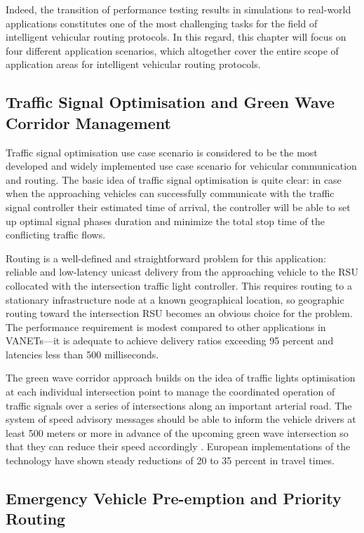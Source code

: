 \documentclass[12pt]{article}
\begin{document}
Indeed, the transition of performance testing results in simulations to real-world applications constitutes one of the most challenging tasks for the field of intelligent vehicular routing protocols. In this regard, this chapter will focus on four different application scenarios, which altogether cover the entire scope of application areas for intelligent vehicular routing protocols.

\subsection{Traffic Signal Optimisation and Green Wave Corridor Management}

Traffic signal optimisation use case scenario is considered to be the most developed and widely implemented use case scenario for vehicular communication and routing. The basic idea of traffic signal optimisation is quite clear: in case when the approaching vehicles can successfully communicate with the traffic signal controller their estimated time of arrival, the controller will be able to set up optimal signal phases duration and minimize the total stop time of the conflicting traffic flows.

Routing is a well-defined and straightforward problem for this application: reliable and low-latency unicast delivery from the approaching vehicle to the RSU collocated with the intersection traffic light controller. This requires routing to a stationary infrastructure node at a known geographical location, so geographic routing toward the intersection RSU becomes an obvious choice for the problem. The performance requirement is modest compared to other applications in VANETs---it is adequate to achieve delivery ratios exceeding 95 percent and latencies less than 500 milliseconds.

The green wave corridor approach builds on the idea of traffic lights optimisation at each individual intersection point to manage the coordinated operation of traffic signals over a series of intersections along an important arterial road. The system of speed advisory messages should be able to inform the vehicle drivers at least 500 meters or more in advance of the upcoming green wave intersection so that they can reduce their speed accordingly \cite{karagiannis2011vehicular}. European implementations of the technology have shown steady reductions of 20 to 35 percent in travel times.

\subsection{Emergency Vehicle Pre-emption and Priority Routing}
\end{document}
